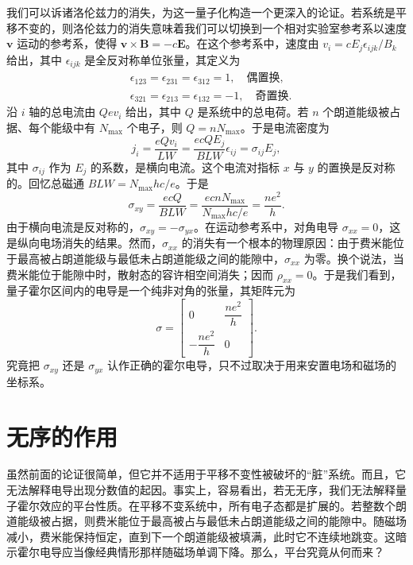 我们可以诉诸洛伦兹力的消失，为这一量子化构造一个更深入的论证。若系统是平移不变的，则洛伦兹力的消失意味着我们可以切换到一个相对实验室参考系以速度 $\mathbf{v}$ 运动的参考系，使得 $\mathbf{v}\times\mathbf{B}=-c\mathbf{E}$。在这个参考系中，速度由 $v_{i}=cE_{j}\epsilon_{ijk}/B_{k}$ 给出，其中 $\epsilon_{ijk}$ 是全反对称单位张量，其定义为
\begin{align*}
&\epsilon_{123}=\epsilon_{231}=\epsilon_{312}=1,\quad\text{偶置换},\\
&\epsilon_{321}=\epsilon_{213}=\epsilon_{132}=-1,\quad\text{奇置换}.\tag{15.22}
\end{align*}
沿 $i$ 轴的总电流由 $Qev_{i}$ 给出，其中 $Q$ 是系统中的总电荷。若 $n$ 个朗道能级被占据、每个能级中有 $N_{\mathrm{max}}$ 个电子，则 $Q=nN_{\mathrm{max}}$。于是电流密度为
\begin{equation*}
j_{i}=\frac{eQv_{i}}{LW}=\frac{ecQE_{j}}{BLW}\epsilon_{ij}=\sigma_{ij}E_{j},\tag{15.23}
\end{equation*}
其中 $\sigma_{ij}$ 作为 $E_{j}$ 的系数，是横向电流。这个电流对指标 $x$ 与 $y$ 的置换是反对称的。回忆总磁通 $BLW=N_{\mathrm{max}}hc/e$。于是
\begin{equation*}
\sigma_{xy}=\frac{ecQ}{BLW}=\frac{ecnN_{\mathrm{max}}}{N_{\mathrm{max}}hc/e}=\frac{ne^{2}}{h}.\tag{15.24}
\end{equation*}
由于横向电流是反对称的，$\sigma_{xy}=-\sigma_{yx}$。在运动参考系中，对角电导 $\sigma_{xx}=0$，这是纵向电场消失的结果。然而，$\sigma_{xx}$ 的消失有一个根本的物理原因：由于费米能位于最高被占朗道能级与最低未占朗道能级之间的能隙中，$\sigma_{xx}$ 为零。换个说法，当费米能位于能隙中时，散射态的容许相空间消失；因而 $\rho_{xx}=0$。于是我们看到，量子霍尔区间内的电导是一个纯非对角的张量，其矩阵元为
\begin{equation*}
\sigma=\left[\begin{array}{cc}
0 & \dfrac{ne^{2}}{h}\\[3mm]
-\dfrac{ne^{2}}{h} & 0
\end{array}\right].\tag{15.25}
\end{equation*}
究竟把 $\sigma_{xy}$ 还是 $\sigma_{yx}$ 认作正确的霍尔电导，只不过取决于用来安置电场和磁场的坐标系。

\section{无序的作用}

虽然前面的论证很简单，但它并不适用于平移不变性被破坏的“脏”系统。而且，它无法解释电导出现分数值的起因。事实上，容易看出，若无无序，我们无法解释量子霍尔效应的平台性质。在平移不变系统中，所有电子态都是扩展的。若整数个朗道能级被占据，则费米能位于最高被占与最低未占朗道能级之间的能隙中。随磁场减小，费米能保持恒定，直到下一个朗道能级被填满，此时它不连续地跳变。这暗示霍尔电导应当像经典情形那样随磁场单调下降。那么，平台究竟从何而来？

